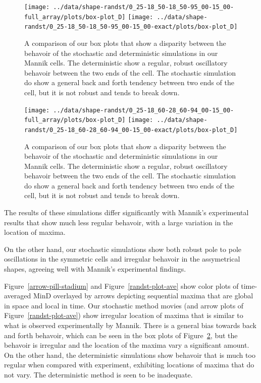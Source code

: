 \documentclass[letterpaper,twocolumn,amsmath,amssymb,pre]{revtex4-1}
\begin{document}
\begin{figure}
  \texttt{[image: ../data/shape-randst/0\_25-18\_50-18\_50-95\_00-15\_00-full\_array/plots/box-plot\_D]}
  \texttt{[image: ../data/shape-randst/0\_25-18\_50-18\_50-95\_00-15\_00-exact/plots/box-plot\_D]}
  \caption{A comparison of our box plots that show a disparity between
    the behavoir of the stochastic and deterministic simulations in
    our Mannik cells.  The deterministic show a regular, robust
    oscillatory behavoir between the two ends of the cell. The
    stochastic simulation do show a general back and forth tendency
    between two ends of the cell, but it is not robust and tends to
    break down.}
  \label{box-mannik}
\end{figure}
\begin{figure}
  \texttt{[image: ../data/shape-randst/0\_25-18\_60-28\_60-94\_00-15\_00-full\_array/plots/box-plot\_D]}
  \texttt{[image: ../data/shape-randst/0\_25-18\_60-28\_60-94\_00-15\_00-exact/plots/box-plot\_D]}
  \caption{A comparison of our box plots that show a disparity between
    the behavoir of the stochastic and deterministic simulations in
    our Mannik cells.  The deterministic show a regular, robust
    oscillatory behavoir between the two ends of the cell. The
    stochastic simulation do show a general back and forth tendency
    between two ends of the cell, but it is not robust and tends to
    break down.}
  \label{box-mannik}
\end{figure}

The results of these simulations differ significantly with Mannik's
experimental results that show much less regular behavoir, with a
large variation in the location of maxima.

On the other hand, our stochastic simulations show both robust pole to
pole oscillations in the symmetric cells and irregular behavoir in the
assymetrical shapes, agreeing well with Mannik's experimental
findings.

Figure~\ref{arrow-pill-stadium} and Figure~\ref{randst-plot-ave} show
color plots of time-averaged MinD overlayed by arrows depicting
sequential maxima that are global in space and local in time.  Our
stochastic method movies (and arrow plots of
Figure~\ref{randst-plot-ave}) show irregular location of maxima that
is similar to what is observed experimentally by Mannik. There is a
general bias towards back and forth behavoir, which can be seen in the
box plots of Figure~\ref{box-mannik}, but the behavoir is irregular
and the location of the maxima vary a significant amount.  On the
other hand, the deterministic simulations show behavoir that is much
too regular when compared with experiment, exhibiting locations of
maxima that do not vary.  The deterministic method is seen to be
inadequate.
\end{document}
